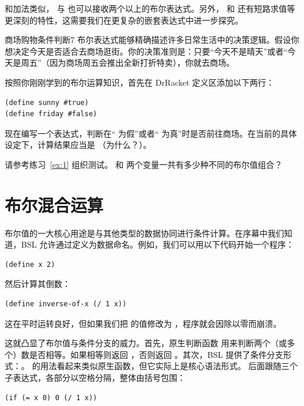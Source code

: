 和加法类似， 与  也可以接收两个以上的布尔表达式。另外， 和  还有短路求值等更深刻的特性，这需要我们在更复杂的嵌套表达式中进一步探究。

\begin{exercise}{商场购物条件判断}{7}
布尔表达式能够精确描述许多日常生活中的决策逻辑。假设你想决定今天是否适合去商场逛街。你的决策准则是：只要“今天不是晴天”或者“今天是周五”（因为商场周五会推出全新打折特卖），你就去商场。

按照你刚刚学到的布尔运算知识，首先在 DrRacket 定义区添加以下两行：
\begin{lstlisting}[language=BSL]
(define sunny #true)
(define friday #false)
\end{lstlisting}

现在编写一个表达式，判断在“ 为假”或者“ 为真”时是否前往商场。在当前的具体设定下，计算结果应当是 （为什么？）。

请参考练习~\ref{ex:1} 组织测试。 和  两个变量一共有多少种不同的布尔值组合？
\end{exercise}


\section{布尔混合运算}
\label{sec:1.6}

布尔值的一大核心用途是与其他类型的数据协同进行条件计算。在序幕中我们知道，BSL 允许通过定义为数据命名。例如，我们可以用以下代码开始一个程序：
\begin{lstlisting}[language=BSL]
(define x 2)
\end{lstlisting}
然后计算其倒数：
\begin{lstlisting}[language=BSL]
(define inverse-of-x (/ 1 x))
\end{lstlisting}
这在平时运转良好，但如果我们把  的值修改为 ，程序就会因除以零而崩溃。

这就凸显了布尔值与条件分支的威力。首先，原生判断函数 \code{=} 用来判断两个（或多个）数是否相等。如果相等则返回 ，否则返回 。其次，BSL 提供了条件分支形式：。 的用法看起来类似原生函数，但它实际上是核心语法形式。 后面跟随三个子表达式，各部分以空格分隔，整体由括号包围：
\begin{lstlisting}[language=BSL]
(if (= x 0) 0 (/ 1 x))
\end{lstlisting}

